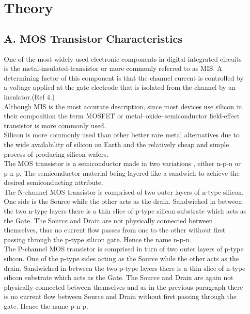 \documentclass{article}
\begin{document}
\section{Theory}\label{sec:theory}
\subsection{A. MOS Transistor Characteristics}
One of the most widely used electronic components in digital integrated circuits is the metal-insulated-transistor or more commonly referred to as MIS. A determining factor of this component is that the channel current is controlled by a voltage applied at the gate electrode that is isolated from the channel by an insulator.(Ref 4.)\\

Although MIS is the most accurate description, since most devices use silicon in their composition the term  MOSFET or metal–oxide–semiconductor field-effect transistor is more commonly used.\\

Silicon is more commonly used than other better rare metal alternatives due to the wide availability of silicon on Earth and the relatively cheap and simple process of producing silicon wafers.\\
 

The MOS transistor is a semiconductor made in two variations , either n-p-n or p-n-p, The semiconductor material being layered like a sandwich to achieve the desired semiconducting attribute.\\


The N-channel MOS transistor is comprised  of two outer layers of n-type silicon. One side is the Source while the other acts as the drain. Sandwiched in between the two n-type layers there is a thin slice of p-type silicon substrate which acts as the Gate. The Source and Drain are not physically connected between themselves, thus no current flow passes from one to the other without first passing through the p-type silicon gate.  Hence the name n-p-n.\\

The P-channel MOS transistor is comprised in turn of two outer layers of p-type silicon. One of the p-type sides acting as the Source while the other acts as the drain. Sandwiched in between the two p-type layers there is a thin slice of n-type silicon substrate which acts as the Gate. The Source and Drain are again not physically connected between themselves and as in the previous paragraph there is no current flow between Source and Drain without first passing through the gate.  Hence the name p-n-p.\\
\end{document}
